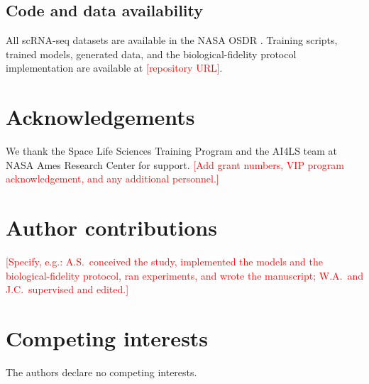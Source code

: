 \documentclass[11pt]{article}
\newcommand{\protname}{biological-fidelity protocol}
\newcommand{\res}[1]{\textcolor{red}{[#1]}}
\begin{document}
\subsection{Code and data availability}
All scRNA-seq datasets are available in the NASA OSDR \cite{osdr}. Training scripts, trained models, generated data, and the \protname{} implementation are available at \res{repository URL}.

\section*{Acknowledgements}
We thank the Space Life Sciences Training Program and the AI4LS team at NASA Ames Research Center for support. \res{Add grant numbers, VIP program acknowledgement, and any additional personnel.}

\section*{Author contributions}
\res{Specify, e.g.: A.S.\ conceived the study, implemented the models and the biological-fidelity protocol, ran experiments, and wrote the manuscript; W.A.\ and J.C.\ supervised and edited.}

\section*{Competing interests}
The authors declare no competing interests.
\end{document}
